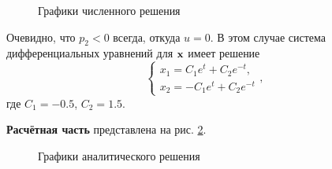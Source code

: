 \documentclass[a4paper, 12pt]{article}
\begin{document}
\begin{figure}[h]
    \noindent{}
    \caption{Графики численного решения}
    \label{41end}
\end{figure} 

Очевидно, что $p_2<0$ всегда, откуда $u=0$. В этом случае система дифференциальных уравнений для ${\bf x}$ имеет решение
\begin{equation}
    \begin{cases}
        x_1=C_1 e^t + C_2 e^{-t},\\
        x_2=-C_1 e^t + C_2 e^{-t}
    \end{cases},
\end{equation}
где $C_1=-0.5$, $C_2=1.5$.

{\bf Расчётная часть} представлена на рис. \ref{42}.
\begin{figure}[h]
    \noindent{}
    \caption{Графики аналитического решения}
    \label{42}
\end{figure} 
\end{document}
